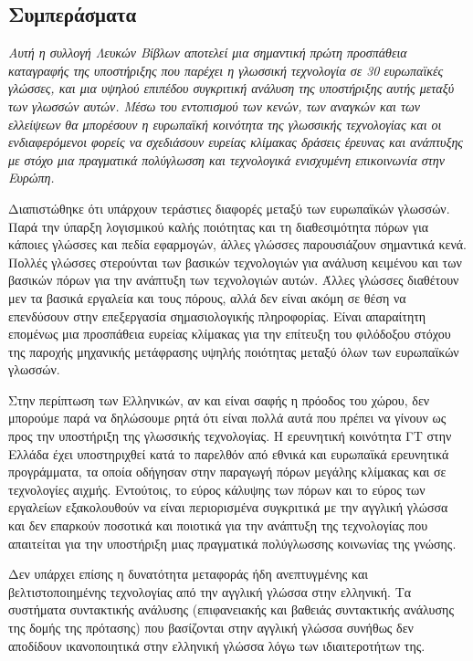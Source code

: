 \documentclass[]{../../metanetpaper}
\begin{document}
\begin{multicols}{2}
\subsection{Συμπεράσματα}

\emph{Αυτή η συλλογή Λευκών Βίβλων αποτελεί μια σημαντική πρώτη προσπάθεια καταγραφής της υποστήριξης που παρέχει η γλωσσική τεχνολογία σε 30 ευρωπαϊκές γλώσσες, και μια υψηλού επιπέδου συγκριτική ανάλυση της υποστήριξης αυτής μεταξύ των γλωσσών αυτών. Μέσω του εντοπισμού των κενών, των αναγκών και των ελλείψεων θα μπορέσουν η  ευρωπαϊκή κοινότητα της γλωσσικής τεχνολογίας και οι ενδιαφερόμενοι φορείς να σχεδιάσουν ευρείας κλίμακας δράσεις έρευνας και ανάπτυξης  με στόχο μια πραγματικά πολύγλωσση και τεχνολογικά ενισχυμένη επικοινωνία στην Ευρώπη.}

Διαπιστώθηκε ότι υπάρχουν τεράστιες διαφορές μεταξύ των ευρωπαϊκών γλωσσών. Παρά την ύπαρξη λογισμικού καλής ποιότητας και τη διαθεσιμότητα πόρων για κάποιες  γλώσσες και  πεδία εφαρμογών, άλλες γλώσσες παρουσιάζουν σημαντικά κενά. Πολλές γλώσσες στερούνται των βασικών τεχνολογιών για ανάλυση κειμένου και των βασικών πόρων για την ανάπτυξη των τεχνολογιών αυτών. Άλλες γλώσσες διαθέτουν μεν τα βασικά εργαλεία και τους πόρους, αλλά δεν είναι ακόμη σε θέση να επενδύσουν στην επεξεργασία σημασιολογικής πληροφορίας. Είναι απαραίτητη επομένως μια προσπάθεια ευρείας κλίμακας για την επίτευξη του φιλόδοξου στόχου της παροχής μηχανικής μετάφρασης υψηλής ποιότητας μεταξύ όλων των ευρωπαϊκών γλωσσών.

Στην περίπτωση των Ελληνικών, αν και είναι σαφής η πρόοδος του χώρου, δεν μπορούμε παρά να δηλώσουμε ρητά ότι είναι πολλά αυτά που πρέπει να γίνουν ως προς την υποστήριξη της γλωσσικής τεχνολογίας. Η ερευνητική κοινότητα ΓΤ στην Ελλάδα έχει υποστηριχθεί κατά το παρελθόν από εθνικά και ευρωπαϊκά ερευνητικά προγράμματα, τα οποία οδήγησαν στην παραγωγή πόρων μεγάλης κλίμακας και σε τεχνολογίες αιχμής. Εντούτοις, το εύρος κάλυψης των πόρων και το εύρος των εργαλείων εξακολουθούν να είναι περιορισμένα συγκριτικά με την αγγλική γλώσσα και δεν επαρκούν ποσοτικά και ποιοτικά για την ανάπτυξη της τεχνολογίας που απαιτείται για την υποστήριξη μιας πραγματικά πολύγλωσσης κοινωνίας της γνώσης.

Δεν υπάρχει επίσης η δυνατότητα μεταφοράς ήδη ανεπτυγμένης και βελτιστοποιημένης τεχνολογίας από την αγγλική γλώσσα στην ελληνική. Τα συστήματα συντακτικής ανάλυσης (επιφανειακής και βαθειάς συντακτικής ανάλυσης της δομής της πρότασης) που βασίζονται στην αγγλική γλώσσα συνήθως δεν αποδίδουν ικανοποιητικά στην ελληνική γλώσσα λόγω των ιδιαιτεροτήτων της.


\end{multicols}
\end{document}

